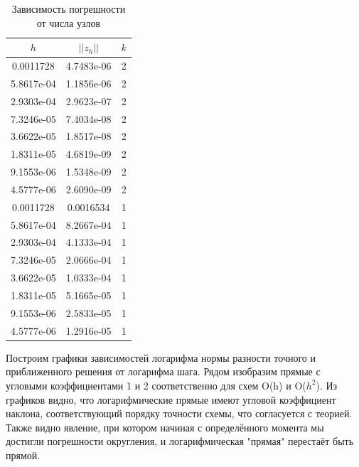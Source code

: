 \documentclass[12pt]{article}
\begin{document}
\begin{table}[H]
\caption{Зависимость погрешности от числа узлов}
\begin{center}
\begin{tabular}{|c|c|c|}
\hline
$h$ & $||z_h||$ & $k$ \\
\hline
0.0011728 & 4.7483e-06 & 2 \\
\hline
5.8617e-04 & 1.1856e-06 & 2 \\
\hline
2.9303e-04 & 2.9623e-07 & 2 \\
\hline
7.3246e-05 & 7.4034e-08 & 2 \\
\hline
3.6622e-05 & 1.8517e-08 & 2 \\
\hline
1.8311e-05 & 4.6819e-09 & 2 \\
\hline
9.1553e-06 & 1.5348e-09 & 2 \\
\hline
4.5777e-06 & 2.6090e-09 & 2 \\
\hline
\hline
0.0011728 & 0.0016534 & 1 \\
\hline
5.8617e-04 & 8.2667e-04 & 1 \\
\hline
2.9303e-04 & 4.1333e-04 & 1 \\
\hline
7.3246e-05 & 2.0666e-04 & 1 \\
\hline
3.6622e-05 & 1.0333e-04 & 1 \\
\hline
1.8311e-05 & 5.1665e-05 & 1 \\
\hline
9.1553e-06 & 2.5833e-05 & 1 \\
\hline
4.5777e-06 & 1.2916e-05 & 1 \\
\hline
\end{tabular}
\end{center}
\end{table}

Построим графики зависимостей логарифма нормы разности точного и приближенного решения от логарифма шага. Рядом изобразим прямые с угловыми коэффициентами 1 и 2 соответственно для схем O(h) и O($h^2$). Из графиков видно, что логарифмические прямые имеют угловой коэффициент наклона, соответствующий порядку точности схемы, что согласуется с теорией. Также видно явление, при котором начиная с определённого момента мы достигли погрешности округления, и логарифмическая "прямая" перестаёт быть прямой.

\newpage
\end{document}
